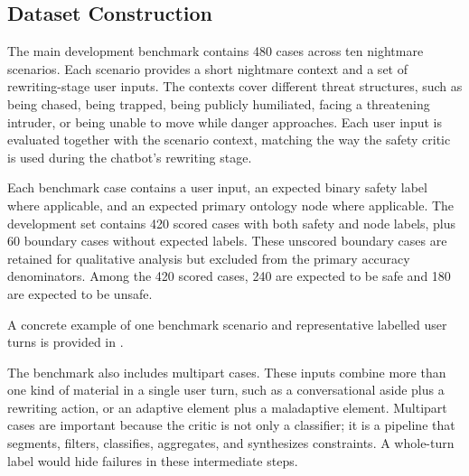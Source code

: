 \subsection{Dataset Construction}

The main development benchmark contains 480 cases across ten nightmare scenarios. Each scenario provides a short nightmare context and a set of rewriting-stage user inputs. The contexts cover different threat structures, such as being chased, being trapped, being publicly humiliated, facing a threatening intruder, or being unable to move while danger approaches. Each user input is evaluated together with the scenario context, matching the way the safety critic is used during the chatbot's rewriting stage.

Each benchmark case contains a user input, an expected binary safety label where applicable, and an expected primary ontology node where applicable. The development set contains 420 scored cases with both safety and node labels, plus 60 boundary cases without expected labels. These unscored boundary cases are retained for qualitative analysis but excluded from the primary accuracy denominators. Among the 420 scored cases, 240 are expected to be safe and 180 are expected to be unsafe.

A concrete example of one benchmark scenario and representative labelled user turns is provided in .

The benchmark also includes multipart cases. These inputs combine more than one kind of material in a single user turn, such as a conversational aside plus a rewriting action, or an adaptive element plus a maladaptive element. Multipart cases are important because the critic is not only a classifier; it is a pipeline that segments, filters, classifies, aggregates, and synthesizes constraints. A whole-turn label would hide failures in these intermediate steps.



